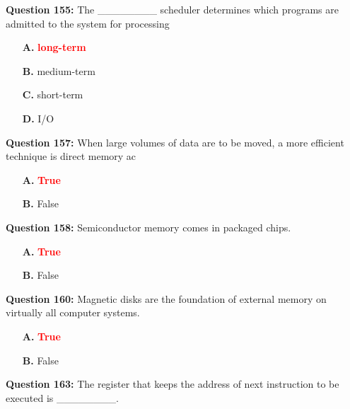 \documentclass[12pt,a4paper]{article}
\begin{document}
\vspace{0.5cm}

\textbf{Question 155:} The ________ scheduler determines which programs are admitted to the system for processing

\begin{itemize}
    \item[\textbf{A.}] \textcolor{red}{\textbf{long-term}}
    \item[\textbf{B.}] medium-term
    \item[\textbf{C.}] short-term
    \item[\textbf{D.}] I/O
\end{itemize}

\vspace{0.5cm}

\textbf{Question 157:} When large volumes of data are to be moved, a more efficient technique is direct memory ac

\begin{itemize}
    \item[\textbf{A.}] \textcolor{red}{\textbf{True}}
    \item[\textbf{B.}] False
\end{itemize}

\vspace{0.5cm}

\textbf{Question 158:} Semiconductor memory comes in packaged chips.

\begin{itemize}
    \item[\textbf{A.}] \textcolor{red}{\textbf{True}}
    \item[\textbf{B.}] False
\end{itemize}

\vspace{0.5cm}

\textbf{Question 160:} Magnetic disks are the foundation of external memory on virtually all computer systems.

\begin{itemize}
    \item[\textbf{A.}] \textcolor{red}{\textbf{True}}
    \item[\textbf{B.}] False
\end{itemize}

\vspace{0.5cm}

\textbf{Question 163:} The register that keeps the address of next instruction to be executed is ________.
\end{document}
